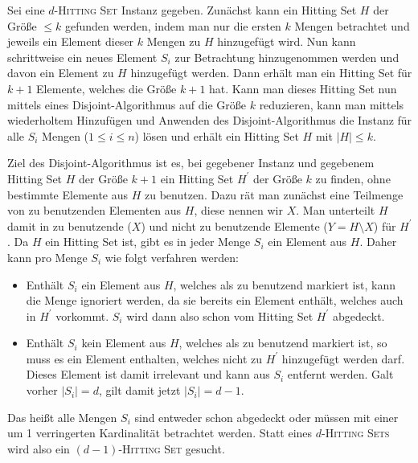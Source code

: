 

\DeclareMathOperator{\vc}{vc}




Sei eine $d$-\textsc{Hitting Set} Instanz gegeben. Zunächst kann ein Hitting Set $H$ der Größe $\leq k$ gefunden werden, indem man nur die ersten $k$ Mengen betrachtet und jeweils ein Element dieser $k$ Mengen zu $H$ hinzugefügt wird. Nun kann schrittweise ein neues Element $S_i$ zur Betrachtung hinzugenommen werden und davon ein Element zu $H$ hinzugefügt werden. Dann erhält man ein Hitting Set für $k+1$ Elemente, welches die Größe $k+1$ hat. Kann man dieses Hitting Set nun mittels eines Disjoint-Algorithmus auf die Größe $k$ reduzieren, kann man mittels wiederholtem Hinzufügen und Anwenden des Disjoint-Algorithmus die Instanz für alle $S_i$ Mengen ($1 \leq i \leq n$) lösen und erhält ein Hitting Set $H$ mit $|H| \leq k$.

Ziel des Disjoint-Algorithmus ist es, bei gegebener Instanz und gegebenem Hitting Set $H$ der Größe $k+1$ ein Hitting Set $H^\prime$ der Größe $k$ zu finden, ohne bestimmte Elemente aus $H$ zu benutzen. Dazu rät man zunächst eine Teilmenge von zu benutzenden Elementen aus $H$, diese nennen wir $X$. Man unterteilt $H$ damit in zu benutzende ($X$) und nicht zu benutzende Elemente ($Y = H \setminus X$) für $H^\prime$. Da $H$ ein Hitting Set ist, gibt es in jeder Menge $S_i$ ein Element aus $H$. Daher kann pro Menge $S_i$ wie folgt verfahren werden:

\begin{itemize}
\item Enthält $S_i$ ein Element aus $H$, welches als zu benutzend markiert ist, kann die Menge ignoriert werden, da sie bereits ein Element enthält, welches auch in $H^\prime$ vorkommt. $S_i$ wird dann also schon vom Hitting Set $H^\prime$ abgedeckt.

\item Enthält $S_i$ kein Element aus $H$, welches als zu benutzend markiert ist, so muss es ein Element enthalten, welches nicht zu $H^\prime$ hinzugefügt werden darf. Dieses Element ist damit irrelevant und kann aus $S_i$ entfernt werden. Galt vorher $|S_i| = d$, gilt damit jetzt $|S_i|=d-1$.

\end{itemize}

Das heißt alle Mengen $S_i$ sind entweder schon abgedeckt oder müssen mit einer um 1 verringerten Kardinalität betrachtet werden. Statt eines $d$-\textsc{Hitting Sets} wird also ein $(d-1)$-\textsc{Hitting Set} gesucht.


